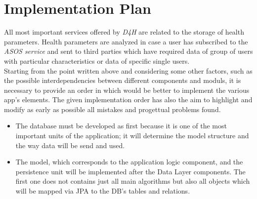 \section{Implementation Plan}
All most important services offered by \textit{D4H} are related to the storage of health parameters. Health parameters are analyzed in case a user has subscribed to the \textit{ASOS service} and sent to third parties which have required data of group of users with particular characteristics or data of specific single users.\\
Starting from the point written above and considering some other factors, such as the possible interdependencies between different components and moduls, it is necessary to provide an order in which would be better to implement the various app's elements.
The given implementation order has also the aim to highlight and modify as early as possible all mistakes and progettual problems found.
\begin{itemize}
	\item The database must be developed as first because it is one of the most important units of the application; it will determine the 	model structure and the way data will be send and used.
	\item  The model, which corresponds to the application logic component, and the persistence unit will be implemented after the 			Data Layer components. The first one does not contains just all main algorithms but also all objects which will be mapped via 		JPA to the DB's tables and relations.
\end{itemize}